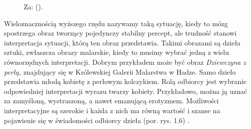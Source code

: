 \documentclass[licencjacka]{kdypl}
\begin{document}
\begin{figure}[H]
    \centering
    \qquad
    \qquad
    \caption{Za: (\citealt[s. 437, 440, 441]{Wieloznacznosc}).}
    
\end{figure}






Wieloznacznością wyższego rzędu nazywamy taką sytuację, kiedy to mózg spostrzega obraz tworzący pojedynczy stabilny percept, ale trudność stanowi interpretacja sytuacji, którą ten obraz przedstawia. Takimi obrazami są dzieła sztuki, zwłaszcza obrazy malarskie, kiedy to musimy wybrać jedną z wielu równorzędnych interpretacji. Dobrym przykładem może być obraz \textit{Dziewczyna z perłą,} znajdujący się w Królewskiej Galerii Malarstwa w Hadze. Samo dzieło przedstawia młodą kobietę z perłowym kolczykiem. Rolą odbiorcy jest wybranie odpowiedniej interpretacji wyrazu twarzy kobiety. Przykładowo, można ją uznać za zamyśloną, wystraszoną, a nawet emanującą erotyzmem. Możliwości interpretacyjne są szerokie i każda z nich ma równą wartość  i szanse na pojawienie się w świadomości odbiorcy dzieła  (por. rys. 1.6) \citep[s. 98-99]{Zeki}.
\end{document}
